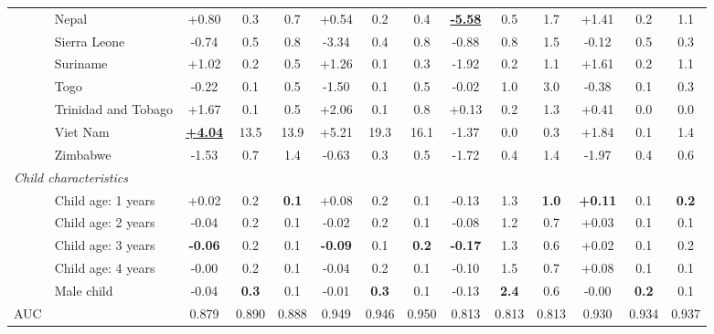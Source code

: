 \begin{landscape}
\begin{table}[p]
\begin{adjustbox}{max width=\textwidth,center}
\begin{tabular}{ll*{12}{c}}
 & Nepal & +0.80 & 0.3 & 0.7 & +0.54 & 0.2 & 0.4 & \textbf{\underline{-5.58}} & 0.5 & 1.7 & +1.41 & 0.2 & 1.1 \\
 & Sierra Leone & -0.74 & 0.5 & 0.8 & -3.34 & 0.4 & 0.8 & -0.88 & 0.8 & 1.5 & -0.12 & 0.5 & 0.3 \\
 & Suriname & +1.02 & 0.2 & 0.5 & +1.26 & 0.1 & 0.3 & -1.92 & 0.2 & 1.1 & +1.61 & 0.2 & 1.1 \\
 & Togo & -0.22 & 0.1 & 0.5 & -1.50 & 0.1 & 0.5 & -0.02 & 1.0 & 3.0 & -0.38 & 0.1 & 0.3 \\
 & Trinidad and Tobago & +1.67 & 0.1 & 0.5 & +2.06 & 0.1 & 0.8 & +0.13 & 0.2 & 1.3 & +0.41 & 0.0 & 0.0 \\
 & Viet Nam & \textbf{\underline{+4.04}} & 13.5 & 13.9 & +5.21 & 19.3 & 16.1 & -1.37 & 0.0 & 0.3 & +1.84 & 0.1 & 1.4 \\
 & Zimbabwe & -1.53 & 0.7 & 1.4 & -0.63 & 0.3 & 0.5 & -1.72 & 0.4 & 1.4 & -1.97 & 0.4 & 0.6 \\
\multicolumn{14}{l}{\textit{Child characteristics}} \\
 & Child age: 1 years & +0.02 & 0.2 & \textbf{0.1} & +0.08 & 0.2 & 0.1 & -0.13 & 1.3 & \textbf{1.0} & \textbf{+0.11} & 0.1 & \textbf{0.2} \\
 & Child age: 2 years & -0.04 & 0.2 & 0.1 & -0.02 & 0.2 & 0.1 & -0.08 & 1.2 & 0.7 & +0.03 & 0.1 & 0.1 \\
 & Child age: 3 years & \textbf{-0.06} & 0.2 & 0.1 & \textbf{-0.09} & 0.1 & \textbf{0.2} & \textbf{-0.17} & 1.3 & 0.6 & +0.02 & 0.1 & 0.2 \\
 & Child age: 4 years & -0.00 & 0.2 & 0.1 & -0.04 & 0.2 & 0.1 & -0.10 & 1.5 & 0.7 & +0.08 & 0.1 & 0.1 \\
 & Male child & -0.04 & \textbf{0.3} & 0.1 & -0.01 & \textbf{0.3} & 0.1 & -0.13 & \textbf{2.4} & 0.6 & -0.00 & \textbf{0.2} & 0.1 \\
\midrule
AUC & & 0.879 & 0.890 & 0.888 & 0.949 & 0.946 & 0.950 & 0.813 & 0.813 & 0.813 & 0.930 & 0.934 & 0.937 \\
\bottomrule
\end{tabular}
\end{adjustbox}
\par\vspace{3pt}

\end{table}
\end{landscape}
